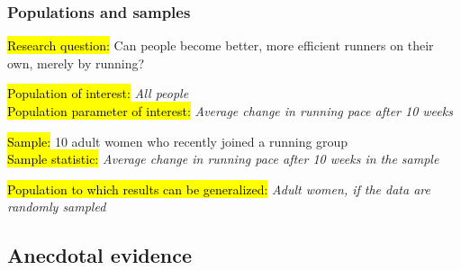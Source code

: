 \documentclass[slidestop,compress,mathserif]{beamer}
\makeatletter
\newcommand{\soln}[1]{\textit{#1}}
\def\chp1@path{../../Chp 1}
\makeatother
\begin{document}
\begin{frame}
	\frametitle{Populations and samples}

	{
	\hl{Research question:} Can people become better, more efficient runners on their own, merely by running? \\

	\pause 

	\hl{Population of interest:} \soln{\pause All people}\\
	\hl{Population parameter of interest:} \soln{\pause Average change in running pace after 10 weeks}
	}
	\pause 
	$\:$ \\
	\hl{Sample:} 10 adult women who recently joined a running group\\
	\hl{Sample statistic:} \soln{\pause Average change in running pace after 10 weeks in the sample}

	\pause

	\hl{Population to which results can be generalized:} \soln{\pause Adult women, if the data are randomly sampled}

\end{frame}


\subsection{Anecdotal evidence}

\end{document}
